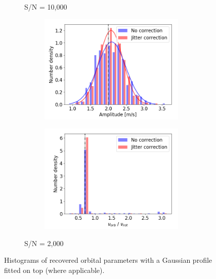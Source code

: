 \begin{figure}[tbp]
\begin{subfigure}[b]{1.0\textwidth}
\begin{subfigure}[b]{0.49\textwidth}
        \end{subfigure}
        \caption{S/N = 10,000}
    \end{subfigure}
    \begin{subfigure}[b]{1.0\textwidth}
    		\begin{subfigure}[b]{0.49\textwidth}
        		\includegraphics[width=\textwidth]{./Figures/Methods/Histogram_new1_p2_sn2000.png}
		\end{subfigure}
		\begin{subfigure}[b]{0.49\textwidth}        		
        		\includegraphics[width=\textwidth]{./Figures/Methods/Histogram_new2_p2_sn2000.png}
        	\end{subfigure}
        	\caption{S/N = 2,000}
    \end{subfigure}	       
    \caption[Histograms of recovered orbital parameters ($A = 2$~m/s)]
    {Histograms of recovered orbital parameters with a Gaussian profile fitted on top (where applicable).}
\label{fig:Histogram}
\end{figure}    

